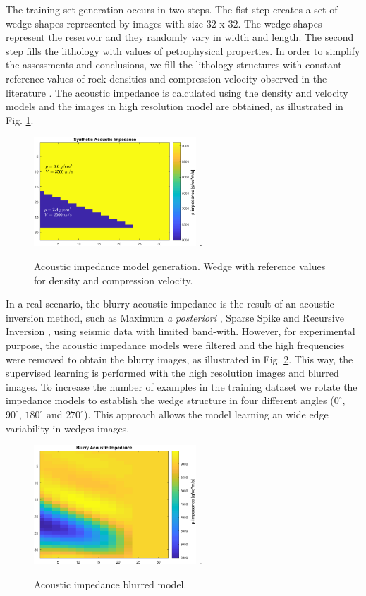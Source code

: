 \documentclass[conference]{IEEEtran}
\begin{document}
The training set generation occurs in two steps.
The fist step creates a set of wedge shapes represented
by images with size $32$ x $32$. The wedge shapes represent the reservoir and they
randomly vary in width and length. The second step fills the lithology with values of petrophysical properties.
In order to simplify the assessments and conclusions, we fill the lithology structures with constant
reference values of rock densities and compression velocity observed in the literature \cite{Mavko2009}.
The acoustic impedance is calculated using the density and velocity models and the images in high
resolution model are obtained, as illustrated in  Fig. \ref{fig_lithology}.
\begin{figure}[!t]
\centering
\includegraphics[width=2.4in]{Figs/image_cunha}
\DeclareGraphicsExtensions.
\caption{Acoustic impedance model generation. Wedge with reference values for density and compression velocity.}
\label{fig_lithology}
\end{figure}

In a real scenario, the blurry acoustic impedance is the
result of an acoustic inversion method, such as Maximum \textit{a posteriori} \cite{Buland2003,Figueiredo2012}, Sparse Spike \cite{Debeye1990} 
and Recursive Inversion \cite{Chopra2001}, using seismic data with limited band-with.
However, for experimental purpose, the acoustic impedance models were filtered
and the high frequencies were removed to obtain the blurry images, as illustrated in Fig. \ref{fig_blur}.
This way, the supervised learning is performed with the high resolution images and blurred images.
To increase the number of examples in the training dataset we rotate
the impedance models to establish the wedge structure in four different angles
($0^{\circ}$, $90^{\circ}$, $180^{\circ}$ and $270^{\circ}$).
This approach allows the model learning an wide edge variability in wedges images.
\begin{figure}[!t]
\centering
\includegraphics[width=2.4in]{Figs/image_cunha_blurry}
\DeclareGraphicsExtensions.
\caption{Acoustic impedance blurred model.}
\label{fig_blur}
\end{figure}
\end{document}
